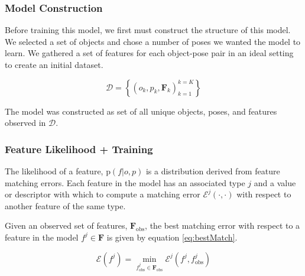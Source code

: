 \documentclass[conference]{IEEEtran}
\newcommand{\prob}[1]{\text{p}(#1)} %
\newcommand{\set}[1]{\mathbf{#1}} %
\newcommand{\cursive}[1]{\mathcal{#1}}
\begin{document}
    \subsubsection{Model Construction}
        Before training this model, we first must construct the structure of this model. We selected a set of objects and chose a number of poses we wanted the model to learn. We gathered a set of features for each object-pose pair in an ideal setting to create an initial dataset.

        \begin{equation}
            \cursive{D} = \left\{ \left(o_k,p_k,\set{F}_k\right)^{k=K}_{k=1} \right\}
        \end{equation}

        The model was constructed as set of all unique objects, poses, and features observed in $\cursive{D}$. %

    \subsubsection{Feature Likelihood + Training}
        The likelihood of a feature, $\prob{f|o,p}$ is a distribution derived from feature matching errors. Each feature in the model has an associated type $j$ and a value or descriptor with which to compute a matching error $\cursive{E}^j(\cdot,\cdot)$ with respect to another feature of the same type. 

        Given an observed set of features, $\set{F}_{\text{obs}}$, the best matching error with respect to a feature in the model $f^j \in \set{F}$ is given by equation
         \ref{eq:bestMatch}.

        \begin{equation}
            \label{eq:bestMatch}
            \cursive{E}(f^j) = \min_{f^j_{\text{obs}} \in \set{F}_{\text{obs}}}\cursive{E}^j(f^j,f^j_{\text{obs}})
        \end{equation}
\end{document}
